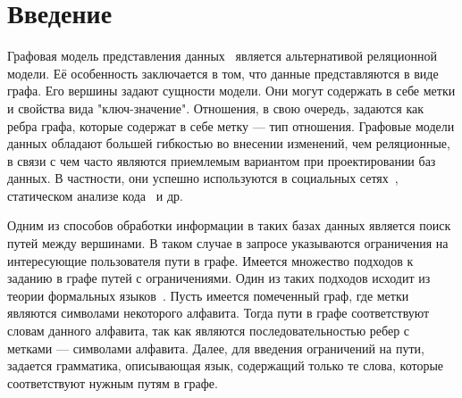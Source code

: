 \documentclass[14pt]{matmex-diploma-custom}
\begin{document}
\maketitle
\tableofcontents
\section*{Введение}
Графовая модель представления данных~\cite{10.1145/298514.298576} является альтернативой реляционной модели. Её
особенность заключается в том, что данные представляются в виде графа. Его вершины
задают сущности модели. Они могут содержать в себе метки и свойства вида
"ключ-значение". Отношения, в свою очередь, задаются как ребра графа, которые
содержат в себе метку --- тип отношения. Графовые модели данных обладают большей
гибкостью во внесении изменений, чем реляционные, в связи с чем часто являются
приемлемым вариантом при проектировании баз данных. В частности, они успешно
используются в социальных сетях~\cite{social}, статическом анализе кода~\cite{URMA2015127} и др.

Одним из способов обработки информации в таких базах данных является поиск путей
между вершинами. В таком случае в запросе указываются ограничения на интересующие пользователя пути в графе.
Имеется множество подходов к заданию в графе путей с ограничениями. Один из таких
подходов исходит из теории формальных языков~\cite{forlangpath}. Пусть имеется помеченный 
граф, где метки являются символами некоторого алфавита. Тогда пути в графе соответствуют 
словам данного алфавита, так как являются последовательностью ребер с метками --- символами алфавита.
Далее, для введения ограничений на пути, задается грамматика, описывающая язык, 
содержащий только те слова, которые соответствуют нужным путям в графе.
\end{document}
